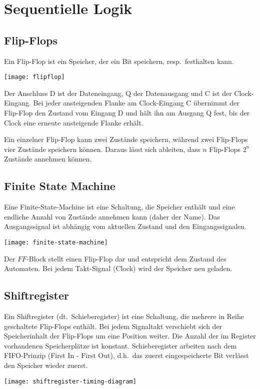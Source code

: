 \section{Sequentielle Logik}\label{sec:sequentielle-logik}

\subsection{Flip-Flops}\label{subsec:flip-flops}

Ein Flip-Flop ist ein Speicher, der ein Bit speichern, resp.\ festhalten kann.
\begin{center}
    \texttt{[image: flipflop]}
\end{center}
Der Anschluss D ist der Dateneingang, Q der Datenausgang und C ist der Clock-Eingang.
Bei jeder ansteigenden Flanke am Clock-Eingang C übernimmt der Flip-Flop den Zustand vom Eingang D und hält ihn am Ausgang Q fest, bis der Clock eine erneute ansteigende Flanke erhält.

Ein einzelner Flip-Flop kann zwei Zustände speichern, während zwei Flip-Flops vier Zustände speichern können.
Daraus lässt sich ableiten, dass $n$ Flip-Flops $2^n$ Zustände annehmen können.

\subsection{Finite State Machine}\label{subsec:finite-state-machine}

Eine Finite-State-Machine ist eine Schaltung, die Speicher enthält und eine endliche Anzahl von Zustände annehmen kann (daher der Name).
Das Ausgangssignal ist abhängig vom aktuellen Zustand und den Eingangssignalen.
\begin{center}
    \texttt{[image: finite-state-machine]}
\end{center}
Der $FF$-Block stellt einen Flip-Flop dar und entspricht dem Zustand des Automaten.
Bei jedem Takt-Signal (Clock) wird der Speicher neu geladen.

\subsection{Shiftregister}\label{subsec:register}

Ein Shiftregister (dt.\ Schieberegister) ist eine Schaltung, die mehrere in Reihe geschaltete Flip-Flops enthält.
Bei jedem Signaltakt verschiebt sich der Speicherinhalt der Flip-Flops um eine Position weiter.
Die Anzahl der im Register vorhandenen Speicherplätze ist konstant.
Schieberegister arbeiten nach dem FIFO-Prinzip (First In - First Out), d.h.\ das zuerst eingespeicherte Bit verlässt den Speicher wieder zuerst.
\begin{center}
    \texttt{[image: shiftregister-timing-diagram]}
\end{center}